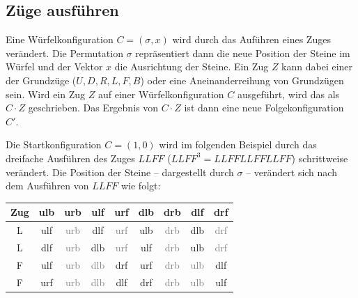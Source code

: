 \documentclass[12pt,a4paper, usenames, dvipsnames]{article}
\theoremstyle{mystyle}
\theoremstyle{definition}
\begin{document}
\subsection{Züge ausführen}

Eine Würfelkonfiguration $C=(\sigma, x)$ wird durch das Auführen eines Zuges verändert. Die Permutation $\sigma$ repräsentiert dann die neue Position der Steine im Würfel und der Vektor $x$ die Ausrichtung der Steine. Ein Zug $Z$ kann dabei einer der Grundzüge ($U,D,R,L,F,B$) oder eine Aneinanderreihung von Grundzügen sein. Wird ein Zug $Z$ auf einer Würfelkonfiguration $C$ ausgeführt, wird das als $C \cdot Z$ geschrieben. Das Ergebnis von $C \cdot Z$ ist dann eine neue Folgekonfiguration $C'$.

Die Startkonfiguration $C=(1,0)$ wird im folgenden Beispiel durch das dreifache Ausführen des Zuges $LLFF$ ($LLFF^3 = LLFFLLFFLLFF$) schrittweise verändert.
Die Position der Steine -- dargestellt durch $\sigma$ -- verändert sich nach dem Ausführen von $LLFF$ wie folgt:

\begin{center}
\begin{tabular}{ccccccccc}
\toprule
\textbf{Zug} & \textbf{ulb} & \textbf{urb} & \textbf{ulf} & \textbf{urf} & \textbf{dlb} & \textbf{drb} & \textbf{dlf} & \textbf{drf} \\
\midrule

L & ulf & \textcolor{gray}{urb} & dlf & \textcolor{gray}{urf} & ulb & \textcolor{gray}{drb} & dlb & \textcolor{gray}{drf} \\

L & dlf & \textcolor{gray}{urb} & dlb & \textcolor{gray}{urf} & ulf & \textcolor{gray}{drb} & ulb & \textcolor{gray}{drf} \\

F & ulf & \textcolor{gray}{urb} & \textcolor{gray}{dlb} & drf & urf & \textcolor{gray}{drb} & \textcolor{gray}{ulb} & dlf \\

F & urf & \textcolor{gray}{urb} & \textcolor{gray}{dlb} & dlf & drf & \textcolor{gray}{drb} & \textcolor{gray}{ulb} & ulf \\
\bottomrule
\end{tabular}
\end{center}
\end{document}
